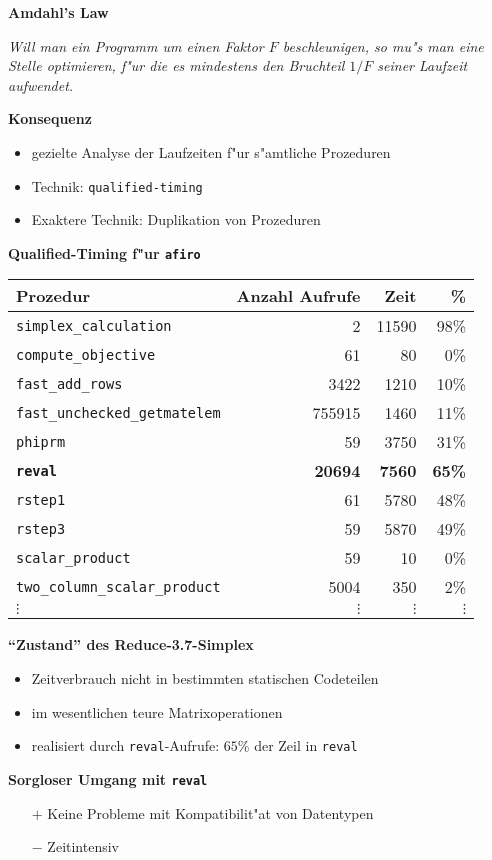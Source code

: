 \documentclass[slidesonly]{seminar}
\newcommand{\scaption}[1]{\centerline{\textbf{\large #1}}\medskip}
\newcommand{\header}[1]{\par\medskip\textbf{\large #1}\par}
\begin{document}
%
\begin{slide}
\scaption{Amdahl's Law}
\emph{Will man ein Programm um einen Faktor $F$ beschleunigen, so mu"s
man eine Stelle optimieren, f"ur die es mindestens den Bruchteil $1/F$ seiner
Laufzeit aufwendet.}
\header{Konsequenz}
\begin{itemize}
\item gezielte Analyse der Laufzeiten f"ur s"amtliche Prozeduren
\item Technik: \texttt{qualified-timing}
\item Exaktere Technik: Duplikation von Prozeduren
\end{itemize}
\end{slide}
%
\begin{slide}
\scaption{Qualified-Timing f"ur \texttt{afiro}}
\begin{small}
\begin{tabular}{lrrr}
Prozedur & Anzahl Aufrufe & Zeit & \% \\
\hline
\texttt{simplex\_calculation} & 2 & 11590 & 98\% \\
\texttt{compute\_objective} & 61 & 80 & 0\% \\
\texttt{fast\_add\_rows} & 3422 & 1210 & 10\% \\ 
\texttt{fast\_unchecked\_getmatelem} & 755915 & 1460 & 11\% \\
\texttt{phiprm} & 59 & 3750 & 31\% \\
\textbf{\texttt{reval}} & \textbf{20694} & \textbf{7560} & \textbf{65\%} \\
\texttt{rstep1} & 61 & 5780 & 48\% \\
\texttt{rstep3} & 59 & 5870 & 49\% \\
\texttt{scalar\_product} & 59 & 10 & 0\% \\
\texttt{two\_column\_scalar\_product} & 5004 & 350 & 2\% \\
$\vdots$ & $\vdots$ & $\vdots$& $\vdots$
\end{tabular}
\end{small}
\end{slide}
%
\begin{slide}
\scaption{"`Zustand"' des Reduce-3.7-Simplex}
\begin{itemize}
\item Zeitverbrauch nicht in bestimmten statischen Codeteilen
\item im wesentlichen teure Matrixoperationen
\item realisiert durch \texttt{reval}-Aufrufe: $65\%$ der Zeil in
\texttt{reval}
\end{itemize}
\header{Sorgloser Umgang mit \texttt{reval}}
\begin{itemize}
\item[$+$] Keine Probleme mit Kompatibilit"at von Datentypen
\item[$-$] Zeitintensiv
\end{itemize}
\end{slide}
\end{document}
